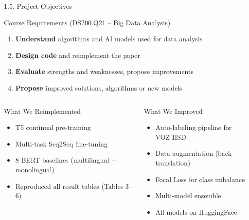 \documentclass[11pt, aspectratio=169]{beamer}
\begin{document}
\begin{frame}[fragile, shrink=8]{1.5. Project Objectives}

\begin{block}{Course Requirements (DS200.Q21 -- Big Data Analysis)}
  \begin{enumerate}
    \item \textbf{Understand} algorithms and AI models used for data analysis
    \item \textbf{Design code} and reimplement the paper
    \item \textbf{Evaluate} strengths and weaknesses, propose improvements
    \item \textbf{Propose} improved solutions, algorithms or new models
  \end{enumerate}
\end{block}

\vspace{0.3cm}
\begin{columns}[T]
  \begin{block}{What We Reimplemented}
    \begin{itemize}
      \item T5 continual pre-training
      \item Multi-task Seq2Seq fine-tuning
      \item 8 BERT baselines (multilingual + monolingual)
      \item Reproduced all result tables (Tables 3--6)
    \end{itemize}
  \end{block}

  \begin{block}{What We Improved}
    \begin{itemize}
      \item Auto-labeling pipeline for VOZ-HSD
      \item Data augmentation (back-translation)
      \item Focal Loss for class imbalance
      \item Multi-model ensemble
      \item All models on HuggingFace
    \end{itemize}
  \end{block}
\end{columns}
\end{frame}
\end{document}
